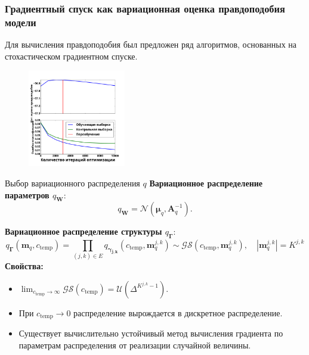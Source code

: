 \documentclass[usenames,dvipsnames,11pt,pdf,utf8,russian,aspectratio=169]{beamer}
\begin{document}
\begin{frame}
\frametitle{Градиентный спуск как вариационная оценка правдоподобия модели}
Для вычисления правдоподобия был предложен ряд алгоритмов, основанных на стохастическом градиентном спуске.
\footnotesize

\begin{multicols}{2}

\begin{figure}
\end{figure}

\columnbreak


\begin{figure}
{\includegraphics[width=0.38\textwidth]{./slide_plots/sgd_show.pdf}}
\end{figure}
\end{multicols}
\end{frame}


   
\begin{frame}{Выбор вариационного распределения $q$}
\textbf{Вариационное распределение параметров $q_{\mathbf{W}}:$}
$$q_\mathbf{W} = \mathcal{N}(\boldsymbol{\mu}_q, \mathbf{A}^{-1}_q).$$

\textbf{Вариационное распределение структуры $q_{\boldsymbol{\Gamma}}:$}
$$q_{\boldsymbol{\Gamma}}( \mathbf{m}_q, c_\text{temp}) = \prod_{(j,k) \in E} q_{\boldsymbol{\gamma_{j,k}}}(c_\text{temp}, \mathbf{m}_q^{j,k}) \sim \mathcal{GS}(c_\text{temp}, \mathbf{m}_q^{j,k}), \quad |\mathbf{m}_q^{j,k}| = K^{j,k}$$ 
\textbf{Свойства:}
\begin{itemize} 
\item $\lim_{c_\text{temp} \to \infty}  \mathcal{GS}(c_\text{temp}) = \mathcal{U}(\Delta^{K^{j,k} -1}).$
\item При ${c_\text{temp} \to 0}$ распределение вырождается в дискретное распределение.
\item Существует вычислительно устойчивый метод вычисления градиента по параметрам распределения от реализации случайной величины.
\end{itemize}
\end{frame}
\end{document}
